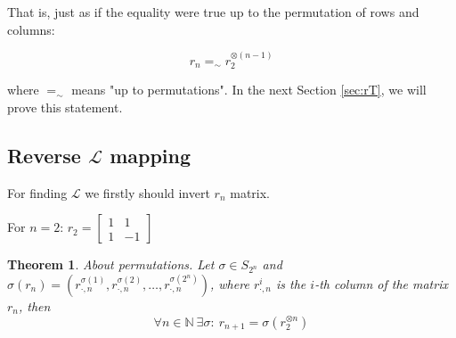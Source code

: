 \documentclass[a4paper, openany, 12pt]{article}
\newtheorem{theorem}{Theorem}
\theoremstyle{remark}
\theoremstyle{definition}
\newcommand{\ot}{\otimes}
\begin{document}
That is, just as if the equality were true up to the permutation of rows and columns:

\begin{equation}
    r_n =_\sim r_2^{\ot (n-1)}
    \label{eq:r_nrecursive}
\end{equation}

where $=_\sim$ means "up to permutations". In the next Section \ref{sec:rT}, we will prove this statement.

\subsection{Reverse $\mathcal{L}$ mapping\label{sec:rT}}


For finding $\mathcal{L}$ we firstly should invert $r_n$ matrix.

For $n=2$: $r_2 = \begin{bmatrix}1&1\\1&-1\end{bmatrix}$

\begin{theorem}{About permutations.\label{th:core}}
    Let $\sigma \in S_{2^n}$ and $\sigma(r_n) = (r^{\sigma(1)}_{\cdot,n}, r^{\sigma(2)}_{\cdot,n}, \dots, r^{\sigma(2^n)}_{\cdot,n})$, where $r^i_{\cdot,n}$ is the $i$-th column of the matrix $r_n$, then
\begin{equation}
    \forall n \in \mathbb{N}\ \exists \sigma:\ r_{n+1} = \sigma(r_2^{\otimes n})
\end{equation}

\end{theorem}
\end{document}
